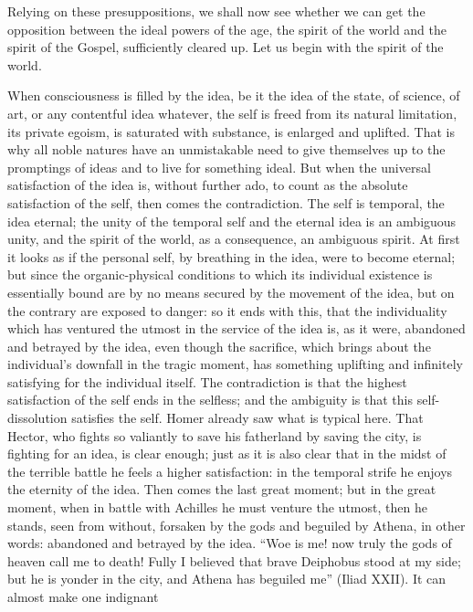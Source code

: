 \documentclass[12pt]{book}
\newcommand{\opage}[1]{\marginnote{\footnotesize\textit{[#1]}}}
\begin{document}
Relying on these presuppositions, we shall now see whether we can get
the opposition between the ideal powers of the age, the spirit of the
world and the spirit of the Gospel, sufficiently cleared up. Let us
begin with the spirit of the world.

When consciousness is filled by the idea, be it the idea of the state,
of science, of art, or any contentful idea whatever, the self is freed
from its natural limitation, its private egoism, is saturated with
substance, is enlarged and uplifted. That is why all noble natures have
an unmistakable need to give themselves up to the promptings of ideas
and to live for something ideal. But when the universal satisfaction of
the idea is, without further ado, to count as the absolute satisfaction
of the self, then comes the contradiction. The self is temporal, the
idea eternal; the unity of the temporal self and the eternal idea is an
ambiguous unity, and the spirit of the world, as a consequence, an
ambiguous spirit. At first it looks as if the personal self, by
breathing in the idea, were to become eternal; but since the
organic-physical conditions to which its individual existence is
essentially bound are by no means secured by the movement of the idea,
but on the contrary are exposed to danger: so it ends with this, that
the individuality which has ventured the utmost in the service of the
idea is, as it were, abandoned and betrayed by the idea, even though the
sacrifice, which brings about the individual's downfall in the tragic
moment, has something uplifting and infinitely satisfying for the
individual itself. The contradiction is that the highest satisfaction of
the self ends in the selfless; and the ambiguity is that this
self-dissolution satisfies the self. Homer already saw what is typical
here. That Hector, who fights so valiantly to save his fatherland by
saving the city, is fighting for an idea, is clear enough;
\opage{42}\setcounter{footnote}{0}%
just as it is also clear that in the midst of the terrible battle he
feels a higher satisfaction: in the temporal strife he enjoys the
eternity of the idea. Then comes the last great moment; but in the great
moment, when in battle with Achilles he must venture the utmost, then
he stands, seen from without, forsaken by the gods and beguiled by
Athena, in other words: abandoned and betrayed by the idea. ``Woe is me!
now truly the gods of heaven call me to death! Fully I believed that
brave Deiphobus stood at my side; but he is yonder in the city, and
Athena has beguiled me'' (Iliad XXII). It can almost make one indignant
\end{document}
